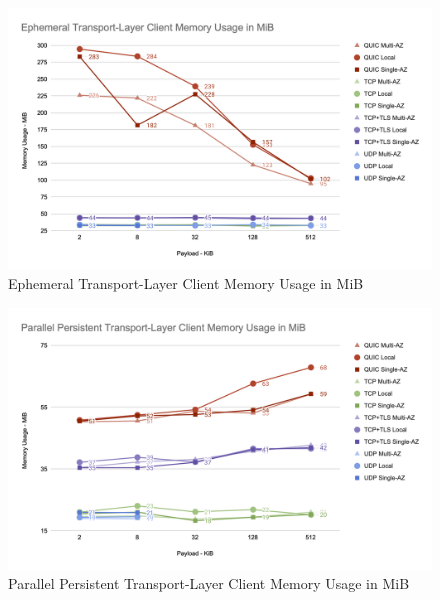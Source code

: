 \begin{figure}[h!]
    \centering
    \includegraphics[width=\linewidth]{figures/charts/Ephemeral Transport-Layer Client Memory Usage in MiB.png}
    \caption{Ephemeral Transport-Layer Client Memory Usage in MiB}
    \label{fig:ephemeral_client_transport_memory}
\end{figure}

\begin{figure}[h!]
    \centering
    \includegraphics[width=\linewidth]{figures/charts/Parallel Persistent Transport-Layer Client Memory Usage in MiB.png}
    \caption{Parallel Persistent Transport-Layer Client Memory Usage in MiB}
    \label{fig:parallel_client_transport_memory}
\end{figure}

